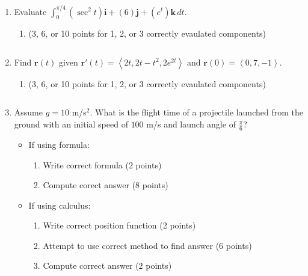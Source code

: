 \documentclass[12pt]{article}
\newcommand{\up}{$~$\vspace*{-0.7in}}
\newcommand{\liner}{\noindent\underline{\hspace*{7in}}}
\newcommand{\ds}{\displaystyle}
\renewcommand{\vec}{\mathbf}
\newcommand{\<}{\left<}
\renewcommand{\>}{\right>}
\begin{document}
\begin{enumerate}

\item Evaluate $\ds \int_0^{\pi/4} (\sec^2 t)\vec{i}+(6)\vec{j}+\left(e^t\right)\vec{k} \, dt$.

  \begin{enumerate}
    \item (3, 6, or 10 points for 1, 2, or 3 correctly evaulated components)
  \end{enumerate}

\vspace*{8in}

\liner
\newpage\up


\item Find $\vec{r}(t)$ given $\vec{r}'(t) = \left<2t, 2t-t^2, 2e^{2t}\right>$ and $\vec{r}(0)=\left<0,7,-1\right>$.

  \begin{enumerate}
    \item (3, 6, or 10 points for 1, 2, or 3 correctly evaulated components)
  \end{enumerate}

\vspace*{8.3in}

\liner
\newpage\up


\item Assume $g=10$ m/s$^2$. What is the flight time of a projectile launched from the ground with an initial speed of $100$ m/s and launch angle of $\frac{\pi}{6}$?

  \begin{itemize}
    \item If using formula:
      \begin{enumerate}
        \item Write correct formula (2 points)
        \item Compute corect answer (8 points)
      \end{enumerate}
    \item If using calculus:
      \begin{enumerate}
        \item Write correct position function (2 points)
        \item Attempt to use correct method to find answer (6 points)
        \item Compute correct answer (2 points)
      \end{enumerate}
  \end{itemize}


\end{enumerate}
\end{document}
